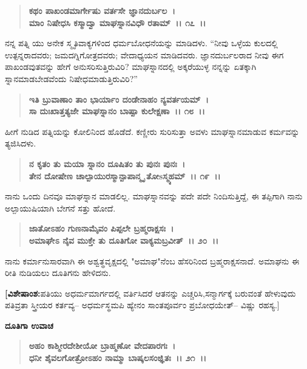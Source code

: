 \begin{verse}
\textbf{ಕಥಂ ಪಾಖಂಡಮಾರ್ಗೇಷು ವರ್ತಸೇ ಜ್ಞಾನದುರ್ಬಲ~।}\\\textbf{ಮಾಂ ನಿಷೇಧಸಿ ಕಸ್ಮಾದ್ವಾ ಮಾಘಸ್ನಾನವಿಧೌ ರತಾಮ್~।। ೧೭~।।}
\end{verse}

ನನ್ನ ಪತ್ನಿ ಯು ಅನೇಕ ಸ್ಮೃತಿವಾಕ್ಯಗಳಿಂದ ಧರ್ಮಬೋಧನೆಯನ್ನು ಮಾಡಿದಳು. “ನೀವು ಒಳ್ಳೆಯ ಕುಲದಲ್ಲಿ ಉತ್ಪನ್ನರಾದವರು; ಜಮದಗ್ನಿಗೋತ್ರದವರು; ವೇದಾಧ್ಯಯನ ಮಾಡಿದವರು. ಜ್ಞಾನದುರ್ಬಲರಾದ ನೀವು ಈಗ ಪಾಖಂಡವುತವನ್ನು ಹೇಗೆ ಅನುಸರಿಸುತ್ತಿರುವಿರಿ? ಮಾಘಸ್ನಾನದಲ್ಲಿ ಅಕ್ಕರೆಯುಳ್ಳ ನನ್ನನ್ನು ಏತಕ್ಕಾಗಿ ಸ್ನಾನಮಾಡಬೇಡವೆಂದು ನಿಷೇಧಮಾಡುತ್ತಿರುವಿರಿ?”

\begin{verse}
\textbf{ಇತಿ ಬ್ರುವಾಣಾಂ ತಾಂ ಭಾರ್ಯಾಂ ದಂಡೇನಾಹಂ ನ್ಯವರ್ತಯಮ್~।}\\\textbf{ಸಾ ದುಃಖಾತ್ತತ್ಯಜೇ ಮಾಘಸ್ನಾನಂ ಬಾಷ್ಪಾ ಕುಲೇಕ್ಷಣಾ~।। ೧೮~।।}
\end{verse}

ಹೀಗೆ ನುಡಿದ ಪತ್ನಿಯನ್ನು ಕೋಲಿನಿಂದ ಹೊಡೆದೆ. ಕಣ್ಣೀರು ಸುರಿಸುತ್ತಾ ಅವಳು ಮಾಘಸ್ನಾನಮಾಡುವ ಕರ್ಮವನ್ನು ತ್ಯಜಿಸಿದಳು.

\begin{verse}
\textbf{ನ ಕೃತಂ ತು ಮಯಾ ಸ್ನಾನಂ ದೂಷಿತಂ ತು ಪುನಃ ಪುನಃ~।}\\\textbf{ತೇನ ದೋಷೇಣ ಚಾಲ್ಪಾಯುರಸ್ಮಾನ್ಪಾಪಾನ್ಮೃ ತೋsಸ್ಮ್ಯಹಮ್~।। ೧೯~।।}
\end{verse}

ನಾನು ಒಂದು ದಿನವೂ ಮಾಘಸ್ನಾನ ಮಾಡಲಿಲ್ಲ. ಮಾಘಸ್ನಾನವನ್ನು ಪದೇ ಪದೇ ನಿಂದಿಸುತ್ತಿದ್ದೆ, ಈ ತಪ್ಪಿಗಾಗಿ ನಾನು ಅಲ್ಪಾಯುಷಿಯಾಗಿ ಬೇಗನೆ ಸತ್ತು ಹೋದೆ.

\begin{verse}
\textbf{ಜಾತೋಽಹಂ ಗುಣನಾಮೈವಂ ಪಿಪ್ಪಲೇ ಬ್ರಹ್ಮರಾಕ್ಷಸಃ~।}\\\textbf{ಅಮಾಘೇಽ ನೈವ ಮುಕ್ತೇ ತು ದೂತಿಗೋ ವಾಕ್ಯಮಬ್ರವೀತ್~।। ೨೦~।।}
\end{verse}

ನಾನು ಕರ್ಮಾನುಸಾರವಾಗಿ ಈ ಅಶ್ವತ್ಥವೃಕ್ಷದಲ್ಲಿ "ಅಮಾಘ"ನೆಂಬ ಹೆಸರಿನಿಂದ ಬ್ರಹ್ಮರಾಕ್ಷಸನಾದೆ. ಅಮಾಘನು ಈ ರೀತಿ ನುಡಿಯಲು ದೂತಿಗನು ಹೇಳಿದನು.

\textbf{[ವಿಶೇಷಾಂಶ:}ಪತಿಯು ಅಧರ್ಮಮಾರ್ಗದಲ್ಲಿ ವರ್ತಿಸಿದರೆ ಆತನನ್ನು ಎಚ್ಚರಿಸಿ,\break ಸನ್ಮಾರ್ಗಕ್ಕೆ ಬರುವಂತೆ ಹೇಳುವುದು ಪತಿವ್ರತಾ ಸ್ತ್ರೀಯರ ಕರ್ತವ್ಯ– ಅಧರ್ಮಸ್ಥಮಪಿ ಹ್ಯೇನಂ ಸಾಂತಪೂರ್ವಂ ಪ್ರಬೋಧಯೇತ್– ವಿಷ್ಣು ರಹಸ್ಯ.]

\begin{flushleft}
\textbf{ದೂತಿಗಾ ಉವಾಚ}
\end{flushleft}

\begin{verse}
\textbf{ಅಹಂ ಕಾಶ್ಮೀರದೇಶೀಯೋ ಬ್ರಾಹ್ಮಣೋ ವೇದಪಾರಗಃ~।}\\\textbf{ಧನೀ ಶೈವಲಗೋತ್ರೋಽಹಂ ನಾಮ್ಮಾ ಬಾಷ್ಕಲಸಂಜ್ಞಿತಃ~।। ೨೧~।। }
\end{verse}

